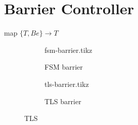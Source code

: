 \documentclass[final]{report}
\begin{document}
\section{Barrier Controller}
map $\{T,Be\} \rightarrow T$
	\begin{figure}[H]
		\centering
			\begin{subfigure}[b]{0.4\textwidth}
				{fsm-barrier.tikz}
				\caption{FSM barrier}
				\label{fig:fsm-barrier}
			\end{subfigure}
			\begin{subfigure}[b]{0.4\textwidth}
				{tls-barrier.tikz}
				\caption{TLS barrier}
				\label{fig:tls-barrier}
			\end{subfigure}
		\caption{TLS}
		\label{fig:barrier}
	\end{figure}
\end{document}
